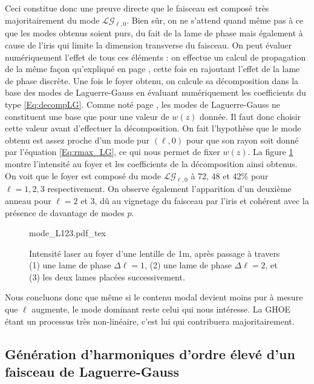 Ceci constitue donc une preuve directe que le faisceau est composé très majoritairement du mode $\mathcal{LG}_{\ell,0}$. Bien sûr, on ne s'attend quand même pas à ce que les modes obtenus soient purs, du fait de la lame de phase mais également à cause de l'iris qui limite la dimension transverse du faisceau. On peut évaluer numériquement l'effet de tous ces éléments : on effectue un calcul de propagation de la même façon qu'expliqué en page \pageref{Fig:IrisScan}, cette fois en rajoutant l'effet de la lame de phase discrète. Une fois le foyer obtenu, on calcule sa décomposition dans la base des modes de Laguerre-Gauss en évaluant numériquement les coefficients du type \ref{Eq:decompLG}. Comme noté page \pageref{Eq:rmax_LG}, les modes de Laguerre-Gauss ne constituent une base que pour une valeur de $w(z)$ donnée. Il faut donc choisir cette valeur avant d'effectuer la décomposition. On fait l'hypothèse que le mode obtenu est assez proche d'un mode pur $(\ell,0)$ pour que son rayon soit donné par l'équation \ref{Eq:rmax_LG}, ce qui nous permet de fixer $w(z)$. La figure \ref{Fig:DecompIR} montre l'intensité au foyer et les coefficients de la décomposition ainsi obtenus. On voit que le foyer est composé du mode $\mathcal{LG}_{\ell,0}$ à 72, 48 et 42\% pour $\ell=1,2,3$ respectivement. On observe également l'apparition d'un deuxième anneau pour $\ell =2$ et 3, dû au vignetage du faisceau par l'iris et cohérent avec la présence de davantage de modes $p$. \par

\begin{figure}[!ht]
\centering
\def\svgwidth{\columnwidth}
{mode_L123.pdf_tex}
\caption{Intensité laser au foyer d'une lentille de 1m, après passage à travers (1) une lame de phase $\Delta\ell = 1$, (2) une lame de phase $\Delta\ell = 2$, et (3) les deux lames placées successivement.}
\label{Fig:DecompIR}
\end{figure}

Nous concluons donc que même si le contenu modal devient moins pur à mesure que $\ell$ augmente, le mode dominant reste celui qui nous intéresse. La GHOE étant un processus très non-linéaire, c'est lui qui contribuera majoritairement. 

\subsection{Génération d'harmoniques d'ordre élevé d'un faisceau de Laguerre-Gauss}
